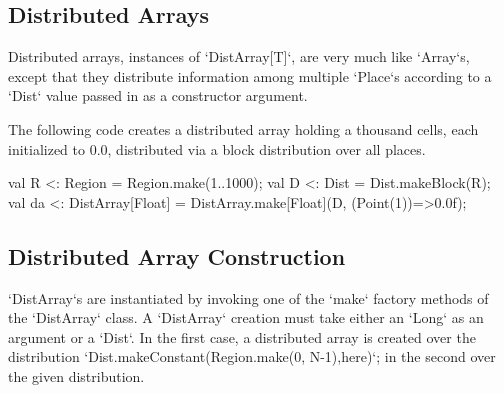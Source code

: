 \subsection{Distributed Arrays}

Distributed arrays, instances of \xcd`DistArray[T]`, are very much like
\xcd`Array`s, except that they distribute information among multiple
\xcd`Place`s according to a \xcd`Dist` value passed in as a constructor
argument.  

\begin{ex}The following code creates a distributed array holding
a thousand cells, each initialized to 0.0, distributed via a block
distribution over all places.
\begin{xten}
val R <: Region = Region.make(1..1000);
val D <: Dist = Dist.makeBlock(R);
val da <: DistArray[Float] 
       = DistArray.make[Float](D, (Point(1))=>0.0f);
\end{xten}
\end{ex}



\subsection{Distributed Array Construction}\label{ArrayInitializer}

\xcd`DistArray`s are instantiated by invoking one of the \xcd`make` factory
methods of the \xcd`DistArray` class.
A \xcd`DistArray` creation 
must take either an \xcd`Long` as an argument or a \xcd`Dist`. In the first
case,  a distributed array is created over the distribution 
\xcd`Dist.makeConstant(Region.make(0, N-1),here)`;
in the second over the given distribution. 

